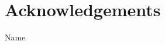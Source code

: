\thispagestyle{plain}			%
\section*{Acknowledgements}


\vspace{1.5cm}
\hfill
Name

\thispagestyle{empty}
\mbox{}
